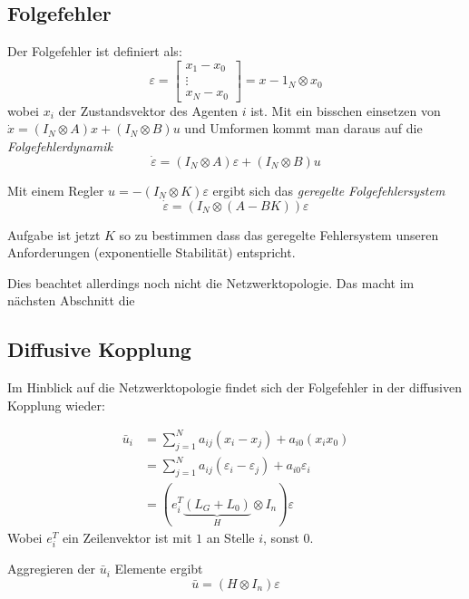 \subsection{Folgefehler}
Der Folgefehler ist definiert als:
\begin{equation}
    \varepsilon = \begin{bmatrix}
        x_1-x_0 \\
        \vdots \\
        x_N-x_0
    \end{bmatrix}
    = x-1_N \otimes x_0
\end{equation}
wobei $x_i$ der Zustandsvektor des Agenten $i$ ist.
Mit ein bisschen einsetzen von $\dot{x} = (I_N \otimes A)x + (I_N \otimes B)u$
und Umformen kommt man daraus auf die \emph{Folgefehlerdynamik}
\begin{equation}
    \dot{\varepsilon} = (I_N \otimes A)\varepsilon + (I_N \otimes B)u
\end{equation}

Mit einem Regler $u=-(I_N \otimes K)\varepsilon$  ergibt sich das
\emph{geregelte Folgefehlersystem}
\begin{equation}
    \dot{\varepsilon} = (I_N \otimes (A-BK))\varepsilon
\end{equation}

Aufgabe ist jetzt $K$ so zu bestimmen dass das geregelte Fehlersystem unseren
Anforderungen (exponentielle Stabilität) entspricht.

Dies beachtet allerdings noch nicht die Netzwerktopologie.
Das macht im nächsten Abschnitt die

\subsection{Diffusive Kopplung}
Im Hinblick auf die Netzwerktopologie findet sich der Folgefehler in der
diffusiven Kopplung wieder:

\begin{align}
    \bar{u}_i &= \sum_{j=1}^N a_{ij} (x_i-x_j) + a_{i0}(x_ix_0) \\
    &= \sum_{j=1}^N a_{ij} (\varepsilon_i - \varepsilon_j) + a_{i0} \varepsilon_i \\
    &= \left(e_i^T\underbrace{(L_G+L_0)}_H \otimes I_n\right)\varepsilon
\end{align}
Wobei $e_i^T$ ein Zeilenvektor ist mit $1$ an Stelle $i$, sonst $0$.

Aggregieren der $\bar{u}_i$ Elemente ergibt
\begin{equation}
    \bar{u} = (H \otimes I_n)\varepsilon
\end{equation}

